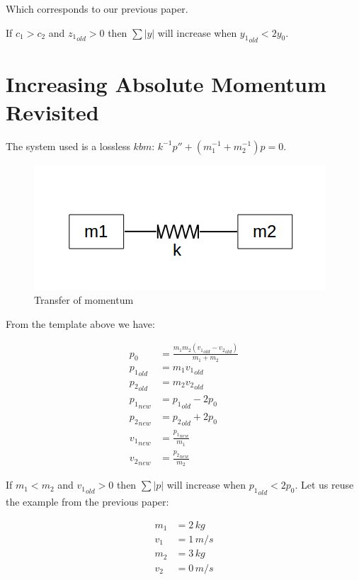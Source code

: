 \documentclass[]{elementary-physics}
\begin{document}
Which corresponds to our previous paper\cite{ef1ch}.

If $c_1 > c_2$ and ${z_1}_{old} > 0$ then $\sum |y|$ will increase when ${y_1}_{old} < 2 y_0$.

\section{Increasing Absolute Momentum Revisited}

The system used is a lossless $kbm$\cite{ef3ch}: $k^{-1} p'' + (m_1^{-1} + m_2^{-1}) p = 0$.

\begin{figure}[ht] \centering
	\includegraphics[scale=.3]{mkm} \caption{Transfer of momentum}
\end{figure}

From the template above we have:

\begin{subequations}
\begin{align}
p_0 &= \frac{m_1 m_2 ({v_1}_{old}-{v_2}_{old})}{m_1 + m_2} \\
{p_1}_{old} &= m_1 {v_1}_{old} \\
{p_2}_{old} &= m_2 {v_2}_{old} \\
{p_1}_{new} &= {p_1}_{old} -2 p_0 \\
{p_2}_{new} &= {p_2}_{old} +2 p_0 \\
{v_1}_{new} &= \frac{{p_1}_{new}}{m_1} \\
{v_2}_{new} &= \frac{{p_2}_{new}}{m_2}
\end{align}
\end{subequations}

If $m_1 < m_2$ and ${v_1}_{old} > 0$ then $\sum |p|$ will increase when ${p_1}_{old} < 2 p_0$.
Let us reuse the example from the previous paper\cite{ef2ch}:

\begin{subequations}
\begin{align}
m_1 &= 2 \, kg \\
v_1 &= 1 \, m/s \\
m_2 &= 3 \, kg \\
v_2 &= 0 \, m/s
\end{align}
\end{subequations}
\end{document}
